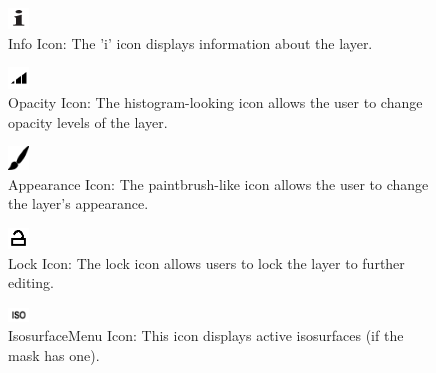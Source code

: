 \documentclass[fleqn,11pt,openany]{book}
\begin{document}
\begin{figure}
  \includegraphics[width=0.05\textwidth]{Seg3DBasicFunctionality_figures/InfoOff.png}%
  \caption{Info Icon: The 'i' icon displays information about the layer.}
\end{figure}

\begin{figure}
  \includegraphics[width=0.05\textwidth]{Seg3DBasicFunctionality_figures/OpacityOff.png}%
  \caption{Opacity Icon: The histogram-looking icon allows the user to change opacity levels of the layer.}
\end{figure}

\begin{figure}
\vspace{4 pt}
  \includegraphics[width=0.05\textwidth]{Seg3DBasicFunctionality_figures/AppearanceOff.png}%
  \caption{Appearance Icon: The paintbrush-like icon allows the user to change the layer's appearance.}
\end{figure}

\begin{figure}
  \includegraphics[width=0.05\textwidth]{Seg3DBasicFunctionality_figures/LockOff.png}%
  \caption{Lock Icon: The lock icon allows users to lock the layer to further editing.}
\end{figure}

\begin{figure}
\vspace{6 pt}
  \includegraphics[width=0.05\textwidth]{Seg3DBasicFunctionality_figures/IsosurfaceMenuOff.png}%
  \caption{IsosurfaceMenu Icon: This icon displays active isosurfaces (if the mask has one).}
\end{figure}
\end{document}
